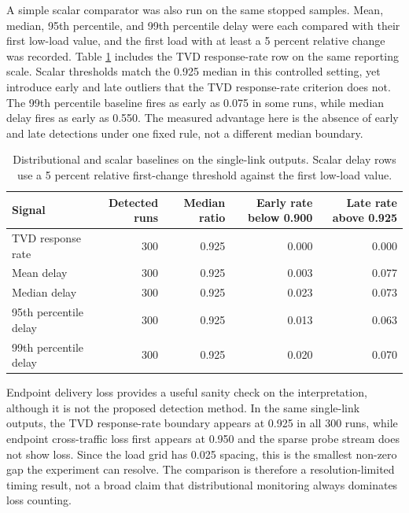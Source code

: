 \documentclass[a4paper,11pt]{report}
\begin{document}
A simple scalar comparator was also run on the same stopped samples. Mean, median, 95th percentile, and 99th percentile delay were each compared with their first low-load value, and the first load with at least a 5 percent relative change was recorded. Table \ref{tab:single-scalar-baselines} includes the TVD response-rate row on the same reporting scale. Scalar thresholds match the 0.925 median in this controlled setting, yet introduce early and late outliers that the TVD response-rate criterion does not. The 99th percentile baseline fires as early as 0.075 in some runs, while median delay fires as early as 0.550. The measured advantage here is the absence of early and late detections under one fixed rule, not a different median boundary.

\begin{table}[htbp]
\centering
\small
\begin{tabular}{lrrrr}
\toprule
Signal & Detected runs & Median ratio & Early rate below 0.900 & Late rate above 0.925 \\
\midrule
TVD response rate & 300 & 0.925 & 0.000 & 0.000 \\
Mean delay & 300 & 0.925 & 0.003 & 0.077 \\
Median delay & 300 & 0.925 & 0.023 & 0.073 \\
95th percentile delay & 300 & 0.925 & 0.013 & 0.063 \\
99th percentile delay & 300 & 0.925 & 0.020 & 0.070 \\
\bottomrule
\end{tabular}
\caption{Distributional and scalar baselines on the single-link outputs. Scalar delay rows use a 5 percent relative first-change threshold against the first low-load value.}
\label{tab:single-scalar-baselines}
\end{table}

Endpoint delivery loss provides a useful sanity check on the interpretation, although it is not the proposed detection method. In the same single-link outputs, the TVD response-rate boundary appears at 0.925 in all 300 runs, while endpoint cross-traffic loss first appears at 0.950 and the sparse probe stream does not show loss. Since the load grid has 0.025 spacing, this is the smallest non-zero gap the experiment can resolve. The comparison is therefore a resolution-limited timing result, not a broad claim that distributional monitoring always dominates loss counting.
\end{document}
